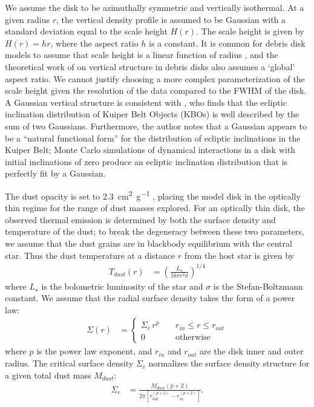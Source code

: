 \documentclass[modern]{aastex62}
\begin{document}
We assume the disk to be azimuthally symmetric and vertically isothermal. 
At a given radius $r$, the vertical density profile is assumed to be Gaussian with a standard deviation equal to the scale height $H(r)$.
The scale height is given by $H(r) = hr$, where the aspect ratio $h$ is a constant.
It is common for debris disk models to assume that scale height is a linear function of radius \citep{sai15,oloffson16}, and the theoretical work of \citet{thebault09} on vertical structure in debris disks also assumes a `global' aspect ratio.
We cannot justify choosing a more complex parameterization of the scale height given the resolution of the data compared to the FWHM of the disk. 
A Gaussian vertical structure is consistent with \citet{brown01}, who finds that the ecliptic inclination distribution of Kuiper Belt Objects (KBOs) is well described by the sum of two Gaussians.
Furthermore, the author notes that a Gaussian appears to be a ``natural functional form'' for the distribution of ecliptic inclinations in the Kuiper Belt; Monte Carlo simulations of dynamical interactions in a disk with initial inclinations of zero produce an ecliptic inclination distribution that is perfectly fit by a Gaussian.

The dust opacity is set to \SI{2.3}{\cm^2.\gram^{-1}} \citep{beckwith90}, placing the model disk in the optically thin regime for the range of dust masses explored.
For an optically thin disk, the observed thermal emission is determined by both the surface density and temperature of the dust; to break the degeneracy between these two parameters, we assume that the dust grains are in blackbody equilibrium with the central star.
Thus the dust temperature at a distance $r$ from the host star is given by
\begin{align}
  T_{dust} (r) &= \left( \frac{L_{\star}}{16 \pi r^2 \sigma} \right)^{1/4}
\end{align}
where $L_{\star}$ is the bolometric luminosity of the star and $\sigma$ is the Stefan-Boltzmann constant. We assume that the radial surface density takes the form of a power law: 
\begin{align}
  \Sigma(r) &= 
  \begin{cases}
    \Sigma_c \, r^{p} \; \; \; \; & r_{in} \leq r \leq r_{out} \\
    0 \; \; \; \; &\mbox{otherwise} 
  \end{cases}
\end{align}
where $p$ is the power law exponent, and $r_{in}$ and $r_{out}$ are the disk inner and outer radius. 
The critical surface density $\Sigma_c$ normalizes the surface density structure for a given total dust mass $M_{dust}$:
\begin{align}
\Sigma_c &= \frac{M_{dust} \left(p + 2 \right)}{2 \pi \left[ r_{out}^{(p+2)} - r_{in}^{(p+2)} \right]}.
\end{align}
\end{document}
